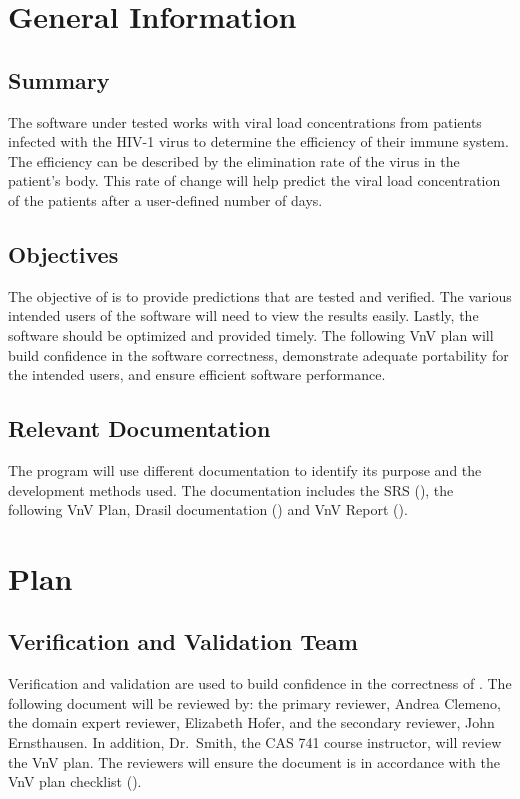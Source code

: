 \documentclass[12pt, titlepage]{article}
\begin{document}
\section{General Information}

\subsection{Summary}

The software under tested works with viral load concentrations from patients infected with the HIV-1 virus to determine the efficiency of their immune system. 
The efficiency can be described by the elimination rate of the virus in the patient's body.
This rate of change will help predict the viral load concentration of the patients after a user-defined number of days. 

\subsection{Objectives}

The objective of \progname{} is to provide predictions that are tested and verified. The various intended users of the software will need to view the results easily. Lastly, the software should be optimized and provided timely. The following VnV plan will build confidence in the software correctness, demonstrate adequate portability for the intended users, and ensure efficient software performance.


\subsection{Relevant Documentation}

The \progname{} program will use different documentation to identify its 
purpose and the development methods used. The documentation includes the SRS 
(\citet{SRS}), the following VnV Plan, Drasil documentation (\citet{DrasilSRS})
and VnV Report (\citet{DiagnoseVNVreport}).



\section{Plan}
	
\subsection{Verification and Validation Team}

Verification and validation are used to build confidence in the correctness of \progname{}. The following document will be reviewed by: the primary reviewer, 
Andrea Clemeno, the domain expert reviewer, Elizabeth Hofer, and the secondary 
reviewer, John Ernsthausen. In addition, Dr.\ Smith, the CAS 741 course 
instructor, will review the VnV plan. The reviewers will ensure the document is 
in accordance with the VnV plan checklist (\citet{Vnvchecklist}). 
\end{document}
